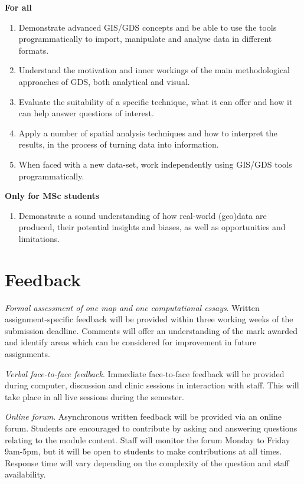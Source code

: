 \documentclass[
  letterpaper,
  DIV=11,
  numbers=noendperiod]{scrreprt}
\providecommand{\tightlist}{%
  \setlength{\itemsep}{0pt}\setlength{\parskip}{0pt}}\usepackage{longtable,booktabs,array}
\begin{document}
\textbf{For all}

\begin{enumerate}
\def\labelenumi{(\arabic{enumi})}
\item
  Demonstrate advanced GIS/GDS concepts and be able to use the tools
  programmatically to import, manipulate and analyse data in different
  formats.
\item
  Understand the motivation and inner workings of the main
  methodological approaches of GDS, both analytical and visual.
\item
  Evaluate the suitability of a specific technique, what it can offer
  and how it can help answer questions of interest.
\item
  Apply a number of spatial analysis techniques and how to interpret the
  results, in the process of turning data into information.
\item
  When faced with a new data-set, work independently using GIS/GDS tools
  programmatically.
\end{enumerate}

\textbf{Only for MSc students}

\begin{enumerate}
\def\labelenumi{\arabic{enumi}.}
\setcounter{enumi}{5}
\tightlist
\item
  Demonstrate a sound understanding of how real-world (geo)data are
  produced, their potential insights and biases, as well as
  opportunities and limitations.
\end{enumerate}

\section*{Feedback}\label{feedback}


\emph{Formal assessment of one map and one computational essays}.
Written assignment-specific feedback will be provided within three
working weeks of the submission deadline. Comments will offer an
understanding of the mark awarded and identify areas which can be
considered for improvement in future assignments.

\emph{Verbal face-to-face feedback}. Immediate face-to-face feedback
will be provided during computer, discussion and clinic sessions in
interaction with staff. This will take place in all live sessions during
the semester.

\emph{Online forum}. Asynchronous written feedback will be provided via
an online forum. Students are encouraged to contribute by asking and
answering questions relating to the module content. Staff will monitor
the forum Monday to Friday 9am-5pm, but it will be open to students to
make contributions at all times. Response time will vary depending on
the complexity of the question and staff availability.
\end{document}

